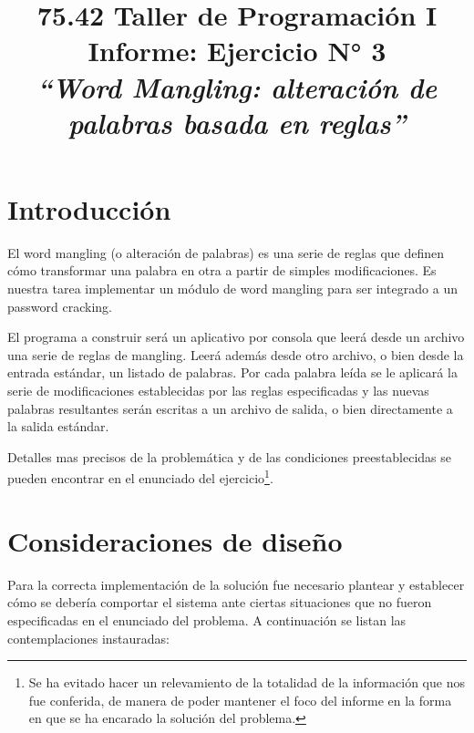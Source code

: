 \documentclass{article}
\begin{document}
\title{\Large 75.42 Taller de Programación I \\ 
	  \medskip\Huge Informe: Ejercicio N° 3  \\
	  \bigskip\Large\textit{``Word Mangling: alteración de palabras basada en reglas''}}
\date{}
\maketitle




\section{Introducción}
	
	El word mangling (o alteración de palabras) es una serie de reglas que definen cómo transformar una palabra en otra a partir de simples modificaciones. Es nuestra tarea implementar un módulo de word mangling para ser integrado a un password cracking. 
	\par
	El programa a construir será un aplicativo por consola que leerá desde un archivo una serie de reglas de mangling. Leerá además desde otro archivo, o bien desde la entrada estándar, un listado de palabras. Por cada palabra leída se le aplicará la serie de modificaciones establecidas por las reglas especificadas y las nuevas palabras resultantes serán escritas a un archivo de salida, o bien directamente a la salida estándar.
	\par
	Detalles mas precisos de la problemática y de las condiciones preestablecidas se pueden encontrar en el enunciado del ejercicio\footnote{Se ha evitado hacer un relevamiento de la totalidad de la información que nos fue conferida, de manera de poder mantener el foco del informe en la forma en que se ha encarado la solución del problema.}.
\bigskip




\section{Consideraciones de diseño}

	Para la correcta implementación de la solución fue necesario plantear y establecer cómo se debería comportar el sistema ante ciertas situaciones que no fueron especificadas en el enunciado del problema. A continuación se listan las contemplaciones instauradas:
\end{document}
